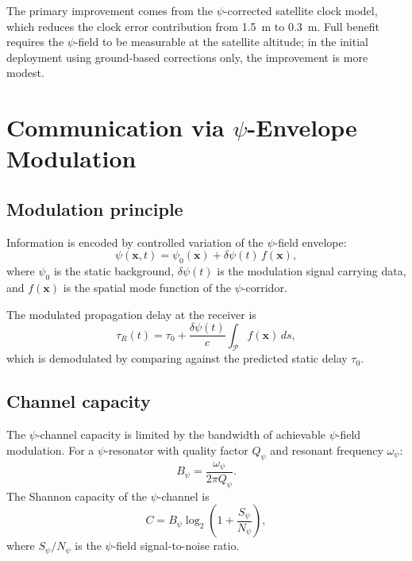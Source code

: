 \documentclass[aps,prd,twocolumn,superscriptaddress,nofootinbib]{revtex4-2}
\begin{document}
The primary improvement comes from the $\psi$-corrected satellite
clock model, which reduces the clock error contribution from 1.5~m to
0.3~m. Full benefit requires the $\psi$-field to be measurable at the
satellite altitude; in the initial deployment using ground-based
corrections only, the improvement is more modest.

\section{Communication via $\psi$-Envelope Modulation}\label{sec:comms}

\subsection{Modulation principle}\label{sec:modulation}

Information is encoded by controlled variation of the $\psi$-field
envelope:
\begin{equation}\label{eq:modulation}
\psi(\mathbf{x},t) = \psi_0(\mathbf{x}) + \delta\psi(t)\,f(\mathbf{x}),
\end{equation}
where $\psi_0$ is the static background, $\delta\psi(t)$ is the
modulation signal carrying data, and $f(\mathbf{x})$ is the spatial
mode function of the $\psi$-corridor.

The modulated propagation delay at the receiver is
\begin{equation}\label{eq:mod-delay}
\tau_R(t) = \tau_0 + \frac{\delta\psi(t)}{c}\int_{\mathcal{P}}
f(\mathbf{x})\,ds,
\end{equation}
which is demodulated by comparing against the predicted static delay
$\tau_0$.

\subsection{Channel capacity}\label{sec:capacity}

The $\psi$-channel capacity is limited by the bandwidth of
achievable $\psi$-field modulation. For a $\psi$-resonator
with quality factor $Q_\psi$ and resonant frequency $\omega_\psi$:
\begin{equation}\label{eq:bandwidth}
B_\psi = \frac{\omega_\psi}{2\pi Q_\psi}.
\end{equation}
The Shannon capacity of the $\psi$-channel is
\begin{equation}\label{eq:Shannon}
C = B_\psi\log_2\!\left(1 + \frac{S_\psi}{N_\psi}\right),
\end{equation}
where $S_\psi/N_\psi$ is the $\psi$-field signal-to-noise ratio.
\end{document}
